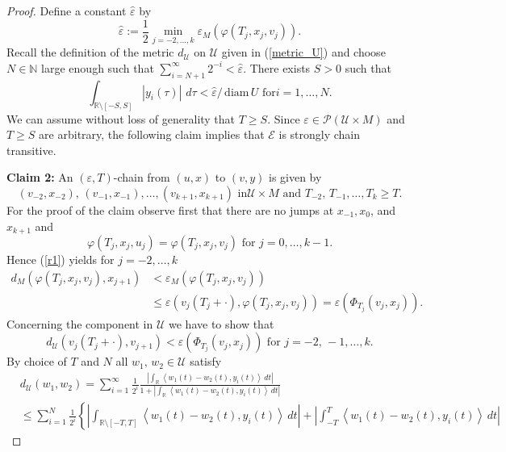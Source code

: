 \documentclass[10pt,a4paper]{amsart}
\begin{document}
\begin{proof}
Define a constant $\widehat{\varepsilon}$ by%
\[
\widehat{\varepsilon}:=\frac{1}{2}\min_{j=-2,\ldots,k}\varepsilon_{M}%
(\varphi(T_{j},x_{j},v_{j})).
\]
Recall the definition of the metric $d_{\mathcal{U}}$ on $\mathcal{U}$ given
in (\ref{metric_U}) and choose $N\in\mathbb{N}$ large enough such that
$\sum_{i=N+1}^{\infty}2^{-i}<\widehat{\varepsilon}$. There exists $S>0$ such
that%
\[
\int_{\mathbb{R}\setminus\left[  -S,S\right]  }\left\vert y_{i}(\tau
)\right\vert \,\,d\tau<\widehat{\varepsilon}/\mathrm{\,diam}\,U\text{ for
}i=1,\ldots,N.
\]
We can assume without loss of generality that $T\geq S$. Since $\varepsilon
\in\mathcal{P}(\mathcal{U}\times M)$ and $T\geq S$ are arbitrary, the
following claim implies that $\mathcal{E}$ is strongly chain transitive.

\textbf{Claim 2: }An $(\varepsilon,T)$-chain from $(u,x)$ to $(v,y)$ is given
by%
\[
(v_{-2},x_{-2}),\,(v_{-1},x_{-1}),\ldots,(v_{k+1},x_{k+1})\text{ in
}\mathcal{U}\times M\text{ and }T_{-2},\,T_{-1},\ldots,T_{k}\geq T.
\]
For the proof of the claim observe first that there are no jumps at
$x_{-1},x_{0}$, and $x_{k+1}$ and%
\[
\varphi(T_{j},x_{j},u_{j})=\varphi(T_{j},x_{j},v_{j})\text{ for }%
j=0,\ldots,k-1.
\]
Hence (\ref{r1}) yields for $j=-2,\ldots,k$
\begin{align*}
d_{M}(\varphi(T_{j},x_{j},v_{j}),x_{j+1})  &  <\varepsilon_{M}(\varphi
(T_{j},x_{j},v_{j}))\\
&  \leq\varepsilon(v_{j}(T_{j}+\cdot),\varphi(T_{j},x_{j},v_{j}))=\varepsilon
(\Phi_{T_{j}}(v_{j},x_{j})).
\end{align*}
Concerning the component in $\mathcal{U}$ we have to show that%
\begin{equation}
d_{\mathcal{U}}(v_{j}(T_{j}+\cdot),v_{j+1})<\varepsilon(\Phi_{T_{j}}%
(v_{j},x_{j}))\text{ for }j=-2,\,-1,\ldots,k. \label{controls}%
\end{equation}
By choice of $T$ and $N$ all $w_{1},\,w_{2}\in\mathcal{U}$ satisfy%
\begin{align*}
&  d_{\mathcal{U}}(w_{1},w_{2})=\sum_{i=1}^{\infty}\frac{1}{2^{i}}%
\frac{\left\vert \int_{\mathbb{R}}\left\langle w_{1}(t)-w_{2}(t),y_{i}%
(t)\right\rangle \,dt\right\vert }{1+\left\vert \int_{\mathbb{R}}\left\langle
w_{1}(t)-w_{2}(t),y_{i}(t)\right\rangle \,dt\right\vert }\\
&  \leq\sum_{i=1}^{N}\frac{1}{2^{i}}\left\{  \left\vert \int_{\mathbb{R}%
\setminus\left[  -T,T\right]  }\left\langle w_{1}(t)-w_{2}(t),y_{i}%
(t)\right\rangle \,dt\right\vert \right.  +\left.  \left\vert \int_{-T}%
^{T}\left\langle w_{1}(t)-w_{2}(t),y_{i}(t)\right\rangle \,dt\right\vert

\end{align*}
\end{proof}
\end{document}
